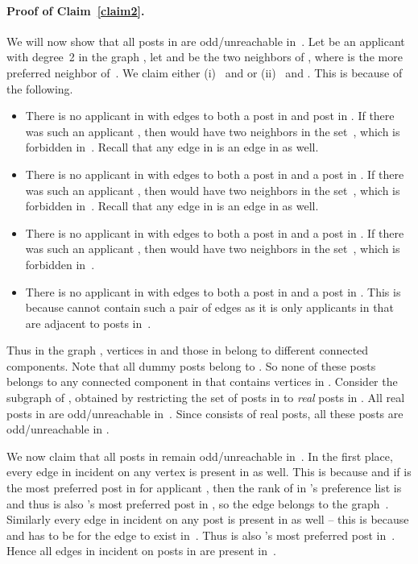\documentclass[11pt]{llncs}
\begin{document}
\paragraph{Proof of Claim~\ref{claim2}.}
We will now show that all posts in  are odd/unreachable in~.
Let  be an applicant with degree~2 in the graph , let  and  be the two 
neighbors of , where  is the more preferred neighbor of~. We claim either 
(i)~ and  or
(ii)~ and .
This is because of the following.

\begin{itemize}
\item There is no applicant in  with edges to both a post in  and post in 
. If there was such an applicant , then  would have two
neighbors in the set~, which is forbidden in~. Recall that
any edge in  is an edge in  as well. 
\item There is no applicant in  with edges to both a post in  and a post in 
. If there was such an applicant , then  would have two
neighbors in the set~, which is forbidden in~. Recall that
any edge in  is an edge in  as well. 
\item There is no applicant in  with edges to both a post in  and a post in 
. If there was such an applicant , then  would have two
neighbors in the set~, which is forbidden in~.
\item There is no applicant  in  with edges to both a post in  and a post in 
. This is because  cannot contain such a pair of edges as it is only applicants 
in  that are adjacent to posts in~.
\end{itemize}

Thus in the graph , vertices in   and those in 
 belong to different connected components. 
Note that all dummy posts belong to . So none of these posts belongs to any
connected component in  that contains vertices in  .
Consider the subgraph  of ,  obtained by restricting the set of posts in  to 
{\em real} posts in . All real posts in  are odd/unreachable in~.  
Since  consists of real posts, all these posts are 
odd/unreachable in .

\smallskip

We now claim that all posts in  remain odd/unreachable in~. 
In the first place, every edge  in  incident on any vertex  
is present in  as well. This is because   and if  is the 
most preferred post in  for applicant , then the rank of  in 's preference 
list is  and thus  is also 's most preferred post in , so the edge 
 belongs to the graph~. Similarly every edge  in  incident on 
any post  is present in  as well -- this is  because  
and  has to be  for the edge  to exist in~. Thus  is also 
's most preferred post in~. Hence all edges in  incident on posts in 
 are present in~.
\end{document}

